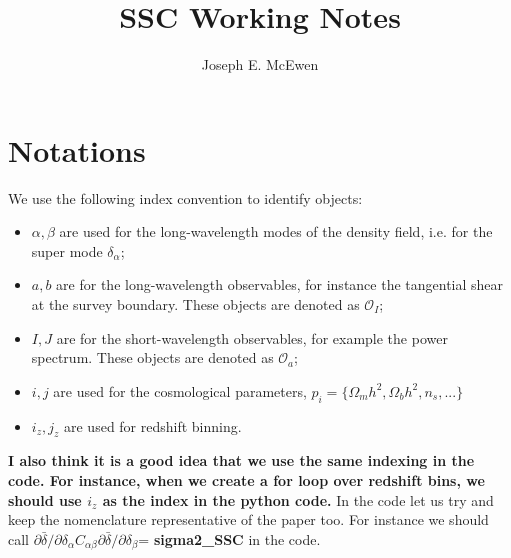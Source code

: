 \documentclass[11pt, oneside]{article}   	%
\title{SSC Working Notes }
\author{Joseph E. McEwen}
\newcommand{\obs}{\mathcal{O}}
\begin{document}
\maketitle


\section{Notations}
We use the following index convention to identify objects:
\begin{itemize}
\item{$\alpha, \beta$ are used for the long-wavelength modes of the density field, i.e. for the super mode $\delta_\alpha$;}
\item{$a, b$ are for the long-wavelength observables, for instance the tangential shear at the survey boundary. These objects are denoted as $\obs_I$;}
\item{$I,J$ are for the short-wavelength observables, for example the power spectrum. These objects are denoted as $\obs_a$; }
\item{$i,j$ are used for the cosmological parameters, $p_i=\{ \Omega_mh^2, \Omega_bh^2, n_s ,...\} $} 
\item{$i_z, j_z$ are used for redshift binning.}
\end{itemize} 
\textbf{I also think it is a good idea that we use the same indexing in the code. For instance, when we create a for loop over redshift bins, we should use $i_z$ as the index in the python code.}
In the code let us try and keep the nomenclature representative of the paper too. For instance we should call $\partial \bar{\delta}/ \partial \delta_\alpha C_{\alpha \beta} \partial \bar{\delta}/ \partial \delta_\beta$= \textbf{sigma2\_SSC} in the code. 
\end{document}

